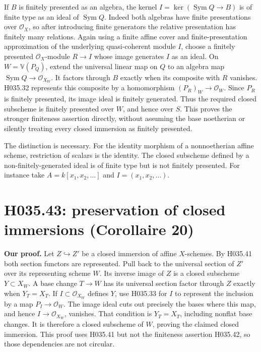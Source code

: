 If $B$ is finitely presented as an algebra, the kernel
$I=\ker(\operatorname{Sym}Q\to B)$ is of finite type as an
ideal of $\operatorname{Sym}Q$. Indeed both algebras have finite
presentations over $\mathcal O_X$, so after introducing finite
generators the relative presentation has finitely many relations.
Again using a finite affine cover and finite-presentation
approximation of the underlying quasi-coherent module $I$,
choose a finitely presented $\mathcal O_X$-module $R\to I$
whose image generates $I$ as an ideal. On
$W=\mathbb V(P_Q)$, extend the universal linear map on $Q$
to an algebra map $\operatorname{Sym}Q\to\mathcal O_{X_W}$.
It factors through $B$ exactly when its composite with $R$
vanishes. H035.32 represents this composite by a homomorphism
$(P_R)_W\to\mathcal O_W$. Since $P_R$ is finitely presented,
its image ideal is finitely generated. Thus the required closed
subscheme is finitely presented over $W$, and hence over $S$.
This proves the stronger finiteness assertion directly, without
assuming the base noetherian or silently treating every closed
immersion as finitely presented.

The distinction is necessary. For the identity morphism of a
nonnoetherian affine scheme, restriction of scalars is the identity.
The closed subscheme defined by a non-finitely-generated ideal is
of finite type but is not finitely presented. For instance take
$A=k[x_1,x_2,\ldots]$ and $I=(x_1,x_2,\ldots)$.

\section{H035.43: preservation of closed immersions (Corollaire 20)}
\textbf{Our proof.} Let $Z\hookrightarrow Z'$ be a closed
immersion of affine $X$-schemes. By H035.41 both section functors
are represented. Pull back to the universal section of $Z'$ over
its representing scheme $W$. Its inverse image of $Z$ is a
closed subscheme $Y\subset X_W$. A base change $T\to W$ has
its universal section factor through $Z$ exactly when
$Y_T=X_T$. If $I\subset\mathcal O_{X_W}$ defines $Y$, use
H035.33 for $I$ to represent the inclusion by a map
$P_I\to\mathcal O_W$. The image ideal cuts out precisely the
bases where this map, and hence $I\to\mathcal O_{X_W}$,
vanishes. That condition is $Y_T=X_T$, including nonflat base
changes. It is therefore a closed subscheme of $W$, proving
the claimed closed immersion. This proof uses H035.41 but not
the finiteness assertion H035.42, so those dependencies are not
circular.

